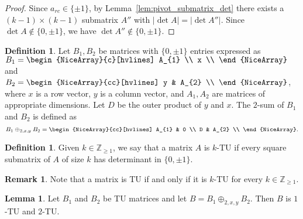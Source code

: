 \documentclass{article}
\theoremstyle{definition}
\newtheorem{lemma}[theorem]{Lemma}
\newtheorem{definition}[theorem]{Definition}
\newtheorem{remark}[theorem]{Remark}
\begin{document}
\begin{proof}
    Since $a_{rc} \in \{\pm 1\}$, by Lemma~\ref{lem:pivot_submatrix_det} there exists a $(k - 1) \times (k - 1)$ submatrix $A''$ with $|\det A| = |\det A''|$. Since $\det A \notin \{0, \pm 1\}$, we have $\det A'' \notin \{0, \pm 1\}$.
\end{proof}

\begin{definition}\label{def:two_sum}
    Let $B_{1}, B_{2}$ be matrices with $\{0, \pm 1\}$ entries expressed as $B_{1} = \begin{NiceArray}{c}[hvlines] A_{1} \\ x \\ \end{NiceArray}$ and $B_{2} = \begin{NiceArray}{cc}[hvlines] y & A_{2} \\ \end{NiceArray}$, where $x$ is a row vector, $y$ is a column vector, and $A_{1}, A_{2}$ are matrices of appropriate dimensions. Let $D$ be the outer product of $y$ and $x$. The $2$-sum of $B_{1}$ and $B_{2}$ is defined as
    \[
        B_{1} \oplus_{2, x, y} B_{2} = \begin{NiceArray}{cc}[hvlines] A_{1} & 0 \\ D & A_{2} \\ \end{NiceArray}.
    \]
\end{definition}

\begin{definition}\label{def:k_tu}
    Given $k \in \mathbb{Z}_{\geq 1}$, we say that a matrix $A$ is $k$-TU if every square submatrix of $A$ of size $k$ has determinant in $\{0, \pm 1\}$.
\end{definition}

\begin{remark}
    Note that a matrix is TU if and only if it is $k$-TU for every $k \in \mathbb{Z}_{\geq 1}$.
\end{remark}

\begin{lemma}\label{lem:two_sum_1_2_tu}
    Let $B_{1}$ and $B_{2}$ be TU matrices and let $B = B_{1} \oplus_{2, x, y} B_{2}$. Then $B$ is $1$-TU and $2$-TU.
\end{lemma}
\end{document}
